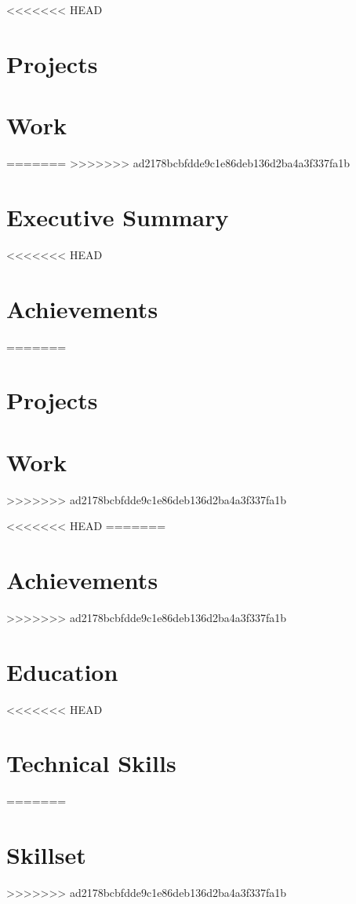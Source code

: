 \documentclass[12pt, a4paper, sans, obeyspaces, unicode]{moderncv}
\begin{document}
\maketitle

\vspace{0.5cm}
<<<<<<< HEAD

\section{Projects}

    


\section{Work}
=======
>>>>>>> ad2178bcbfdde9c1e86deb136d2ba4a3f337fa1b

\section{Executive Summary}


<<<<<<< HEAD
\section{Achievements}

    
=======
\section{Projects}


\section{Work}

>>>>>>> ad2178bcbfdde9c1e86deb136d2ba4a3f337fa1b

\newpage

<<<<<<< HEAD
=======
\section{Achievements}

>>>>>>> ad2178bcbfdde9c1e86deb136d2ba4a3f337fa1b

\section{Education}


<<<<<<< HEAD
    


%    

\section{Technical Skills}

    
=======
\section{Skillset}

>>>>>>> ad2178bcbfdde9c1e86deb136d2ba4a3f337fa1b
\end{document}
